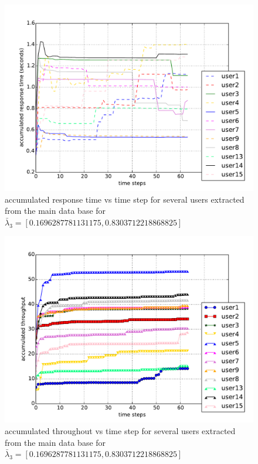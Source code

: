 \documentclass[10pt,journal,compsoc]{IEEEtran}
\begin{document}
\begin{figure}[h] %
\includegraphics[width=\linewidth]{graphs/rt_step_lambda3}
\caption{ accumulated response time vs time step for several users extracted from the main data base for   $\bar{\lambda}_3 = [0.1696287781131175, 0.8303712218868825]$}
\end{figure}

\begin{figure}[h]
\includegraphics[width=\linewidth]{graphs/trough_step_lambda3}
\caption{accumulated throughout vs time step for several users extracted from the main data base for $\bar{\lambda}_3 = [0.1696287781131175, 0.8303712218868825]$}
\end{figure}
\end{document}
